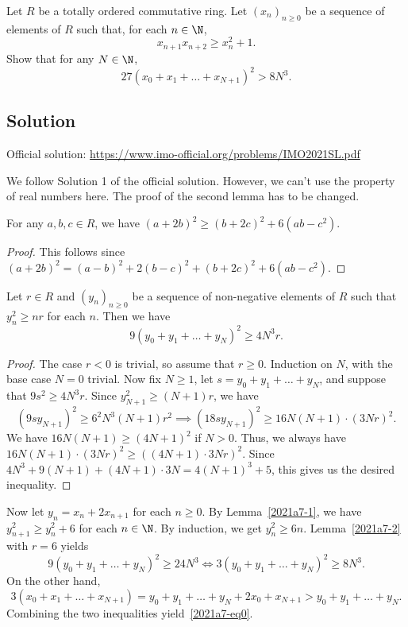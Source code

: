 Let $R$ be a totally ordered commutative ring.
Let $(x_n)_{n \geq 0}$ be a sequence of elements of $R$ such that, for each $n \in \N$,
\[ x_{n + 1} x_{n + 2} \geq x_n^2 + 1. \]
Show that for any $N \in \N$,
\[ 27 (x_0 + x_1 + \ldots + x_{N + 1})^2 > 8N^3. \tag{*}\label{2021a7-eq0} \]



\subsection*{Solution}

Official solution: \url{https://www.imo-official.org/problems/IMO2021SL.pdf}

We follow Solution 1 of the official solution.
However, we can't use the property of real numbers here.
The proof of the second lemma has to be changed.

\begin{lemma}\label{2021a7-1}
For any $a, b, c \in R$, we have $(a + 2b)^2 \geq (b + 2c)^2 + 6(ab - c^2)$.
\end{lemma}
\begin{proof}
This follows since $(a + 2b)^2 = (a - b)^2 + 2(b - c)^2 + (b + 2c)^2 + 6(ab - c^2)$.
\end{proof}

\begin{lemma}\label{2021a7-2}
Let $r \in R$ and $(y_n)_{n \geq 0}$ be a sequence of non-negative elements of $R$ such that $y_n^2 \geq nr$ for each $n$.
Then we have
\[ 9 (y_0 + y_1 + \ldots + y_N)^2 \geq 4N^3 r. \]
\end{lemma}
\begin{proof}
The case $r < 0$ is trivial, so assume that $r \geq 0$.
Induction on $N$, with the base case $N = 0$ trivial.
Now fix $N \geq 1$, let $s = y_0 + y_1 + \ldots + y_N$, and suppose that $9s^2 \geq 4N^3 r$.
Since $y_{N + 1}^2 \geq (N + 1)r$, we have
\[ (9 s y_{N + 1})^2 \geq 6^2 N^3 (N + 1) r^2 \implies (18 s y_{N + 1})^2 \geq 16 N(N + 1) \cdot (3Nr)^2. \]
We have $16 N(N + 1) \geq (4N + 1)^2$ if $N > 0$.
Thus, we always have $16 N(N + 1) \cdot (3Nr)^2 \geq ((4N + 1) \cdot 3Nr)^2$.
Since $4N^3 + 9(N + 1) + (4N + 1) \cdot 3N = 4(N + 1)^3 + 5$, this gives us the desired inequality.
\end{proof}

Now let $y_n = x_n + 2 x_{n + 1}$ for each $n \geq 0$.
By Lemma~\ref{2021a7-1}, we have $y_{n + 1}^2 \geq y_n^2 + 6$ for each $n \in \N$.
By induction, we get $y_n^2 \geq 6n$.
Lemma~\ref{2021a7-2} with $r = 6$ yields
\[ 9 (y_0 + y_1 + \ldots + y_N)^2 \geq 24 N^3 \iff 3 (y_0 + y_1 + \ldots + y_N)^2 \geq 8 N^3. \]
On the other hand,
\[ 3 (x_0 + x_1 + \ldots + x_{N + 1}) = y_0 + y_1 + \ldots + y_N + 2 x_0 + x_{N + 1} > y_0 + y_1 + \ldots + y_N. \]
Combining the two inequalities yield~\eqref{2021a7-eq0}.




